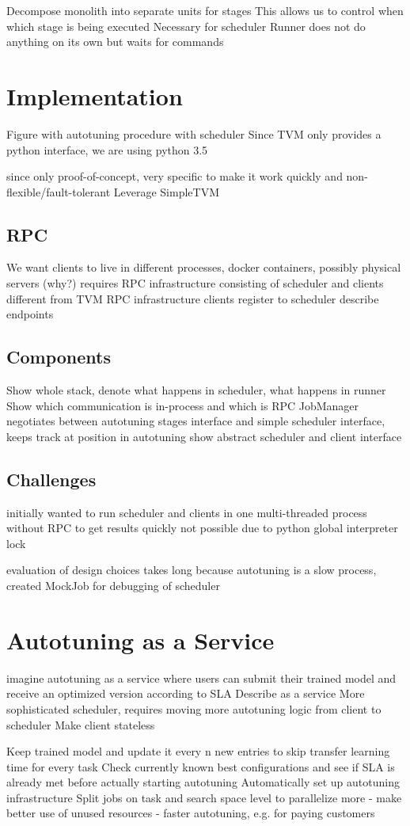 Decompose monolith into separate units for stages
This allows us to control when which stage is being executed
Necessary for scheduler
Runner does not do anything on its own but waits for commands

\section{Implementation}
Figure with autotuning procedure with scheduler
Since TVM only provides a python interface, we are using python 3.5

since only proof-of-concept, very specific to make it work quickly and non-flexible/fault-tolerant
Leverage SimpleTVM


\subsection{RPC}
We want clients to live in different processes, docker containers, possibly physical servers (why?)
requires RPC infrastructure consisting of scheduler and clients
different from TVM RPC infrastructure
clients register to scheduler
describe endpoints

\subsection{Components}
Show whole stack, denote what happens in scheduler, what happens in runner
Show which communication is in-process and which is RPC
JobManager negotiates between autotuning stages interface and simple scheduler interface, keeps track at position in autotuning
show abstract scheduler and client interface

\subsection{Challenges}
initially wanted to run scheduler and clients in one multi-threaded process without RPC to get results quickly
not possible due to python global interpreter lock

evaluation of design choices takes long because autotuning is a slow process, created MockJob for debugging of scheduler

\section{Autotuning as a Service}
imagine autotuning as a service where users can submit their trained model and receive an optimized version according to SLA
Describe as a service
More sophisticated scheduler, requires moving more autotuning logic from client to scheduler
Make client stateless

Keep trained model and update it every n new entries to skip transfer learning time for every task
Check currently known best configurations and see if SLA is already met before actually starting autotuning
Automatically set up autotuning infrastructure
Split jobs on task and search space level to parallelize more
- make better use of unused resources
- faster autotuning, e.g. for paying customers